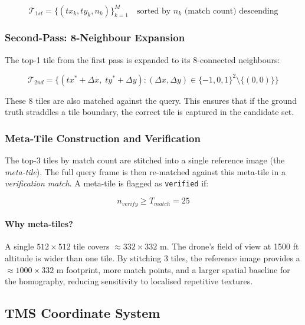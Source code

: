 \documentclass[12pt,a4paper]{article}
\begin{document}
\begin{equation}
    \mathcal{T}_{1st} = \{(tx_k, ty_k, n_k)\}_{k=1}^{M}
    \quad \text{sorted by } n_k \text{ (match count) descending}
    \label{eq:first_pass}
\end{equation}

\subsubsection{Second-Pass: 8-Neighbour Expansion}

The top-1 tile from the first pass is expanded to its 8-connected neighbours:

\begin{equation}
    \mathcal{T}_{2nd} = \{(tx^* + \Delta x,\; ty^* + \Delta y) :
    (\Delta x, \Delta y) \in \{-1,0,1\}^2 \setminus \{(0,0)\}\}
    \label{eq:second_pass}
\end{equation}

These 8 tiles are also matched against the query. This ensures that if the
ground truth straddles a tile boundary, the correct tile is captured in the
candidate set.

\subsubsection{Meta-Tile Construction and Verification}

The top-3 tiles by match count are stitched into a single reference image
(the \emph{meta-tile}). The full query frame is then re-matched against this
meta-tile in a \emph{verification match}. A meta-tile is flagged as
\texttt{verified} if:

\begin{equation}
    n_{verify} \geq T_{match} = 25
    \label{eq:verify_threshold}
\end{equation}

\paragraph{Why meta-tiles?}
A single $512 \times 512$ tile covers $\approx 332 \times 332$ m. The drone's
field of view at 1500 ft altitude is wider than one tile. By stitching 3 tiles,
the reference image provides a $\approx 1000 \times 332$ m footprint, more
match points, and a larger spatial baseline for the homography, reducing
sensitivity to localised repetitive textures.

\subsection{TMS Coordinate System}
\end{document}
